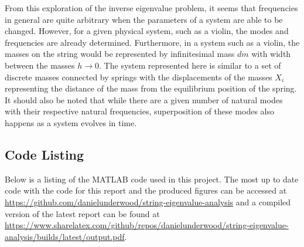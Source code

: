 \documentclass[10pt,a4paper]{article}
\begin{document}
\begin{multicols*}{2}
From this exploration of the inverse eigenvalue problem, it seems that frequencies in general are quite arbitrary when the parameters of a system are able to be changed. However, for a given physical system, such as a violin, the modes and frequencies are already determined. Furthermore, in a system such as a violin, the masses on the string would be represented by infinitesimal mass $dm$ with width between the masses $h \to 0$. The system represented here is similar to a set of discrete masses connected by springs with the displacements of the masses $X_i$ representing the distance of the mass from the equilibrium position of the spring. It should also be noted that while there are a given number of natural modes with their respective natural frequencies, superposition of these modes also happens as a system evolves in time.


\end{multicols*}



\begin{appendices}
	\section{Code Listing} \label{app: Code Listing}

	Below is a listing of the MATLAB code used in this project. The most up to date code with the code for this report and the produced figures can be accessed at \url{https://github.com/danielunderwood/string-eigenvalue-analysis} and a compiled version of the latest report can be found at \url{https://www.sharelatex.com/github/repos/danielunderwood/string-eigenvalue-analysis/builds/latest/output.pdf}.

	
\end{appendices}
\end{document}
